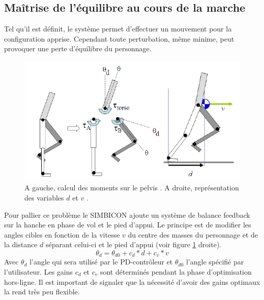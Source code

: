\documentclass[runningheads,a4paper]{llncs}
\begin{document}
\subsection{Maîtrise de l'équilibre au cours de la marche}

Tel qu'il est définit, le système permet d'effectuer un mouvement pour la configuration apprise. Cependant toute perturbation, même minime, peut provoquer une perte d'équilibre du personnage.

\begin{figure}[h]
\centering
\includegraphics[scale=0.5]{stance_torque_and_v_and_d.png}
\caption{A gauche, calcul des moments sur le pelvis \cite{yin2007simbicon}. A droite, représentation des variables \(d\) et \(v\) \cite{yin2007simbicon}.}
\label{fig:torques_pelvis}
\label{fig:d_and_v}
\end{figure}

Pour pallier ce problème le SIMBICON ajoute un système de balance feedback sur la hanche en phase de vol et le pied d'appui. Le principe est de modifier les angles cibles en fonction de la vitesse $v$ du centre des masses du personnage et de la distance \(d\) séparant celui-ci et le pied d'appui (voir figure \ref{fig:d_and_v} droite). 
\[
\theta_d=\theta_{d0} + c_d*d + c_v*v 
\]
Avec \(\theta_d\) l'angle qui sera utilisé par le PD-contrôleur et \(\theta_{d0}\) l'angle spécifié par l'utilisateur.
Les gains \(c_d\) et \(c_v\) sont déterminés pendant la phase d'optimisation hors-ligne. Il est important de signaler que la nécessité d'avoir des gains optimaux la rend très peu flexible.
\end{document}

